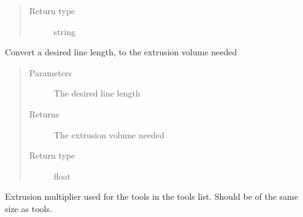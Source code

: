 \documentclass[letterpaper,10pt,english]{sphinxmanual}
\begin{document}
\begin{fulllineitems}
\begin{fulllineitems}
\begin{quote}
\begin{description}
\item[{Return type}] \leavevmode
\sphinxAtStartPar
string

\end{description}\end{quote}

\end{fulllineitems}


\begin{fulllineitems}
\label{\detokenize{index:generator.generator.extrusion_for_length}}
\sphinxAtStartPar
Convert a desired line length, to the extrusion volume needed
\begin{quote}\begin{description}
\item[{Parameters}] \leavevmode
\sphinxAtStartPar
{} \textendash{} The desired line length

\item[{Returns}] \leavevmode
\sphinxAtStartPar
The extrusion volume needed

\item[{Return type}] \leavevmode
\sphinxAtStartPar
float

\end{description}\end{quote}

\end{fulllineitems}


\begin{fulllineitems}
\label{\detokenize{index:generator.generator.extrusion_multiplier}}
\sphinxAtStartPar
Extrusion multiplier used for the tools in the tools list. Should be of the same size as tools.

\end{fulllineitems}



\end{fulllineitems}
\end{document}

